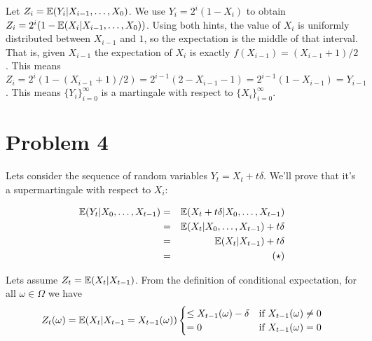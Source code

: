 \documentclass[a4paper]{article}
\begin{document}


Let $ Z_i = \mathbb{E}(Y_i | X_{i-1}, \dots, X_0) $. We use $ Y_i = 2^i(1 - X_i) $ to
obtain $ Z_i = 2^i(1 - \mathbb{E}(X_i|X_{i-1}, \dots, X_0)) $. Using both hints, the
value of $ X_i $ is uniformly distributed between $ X_{i-1} $ and $ 1 $, so the
expectation is the middle of that interval. That is, given $ X_{i-1} $ the
expectation of $ X_i $ is exactly $ f(X_{i-1}) = (X_{i-1} + 1) / 2 $. This
means $ Z_i = 2^i(1 - (X_{i-1} + 1) / 2) = 2^{i-1}(2 - X_{i-1} - 1) = 2^{i-1}(1
- X_{i-1}) = Y_{i-1} $. This means $ \{ Y_i \}_{i=0}^{\infty} $ is
a martingale with respect to $ \{X_i\}_{i=0}^{\infty} $.

\section*{Problem 4}

Lets consider the sequence of random variables $ Y_t = X_t + t\delta $. We'll prove that it's a supermartingale with respect to $ X_i $:

\begin{eqnarray*}
\mathbb{E}(Y_t|X_0,\dots,X_{t-1})
  &=& \mathbb{E}(X_t + t\delta|X_0, \dots, X_{t-1}) \\
  &=& \mathbb{E}(X_t|X_0, \dots, X_{t-1}) + t\delta \\
  &=& \mathbb{E}(X_t|X_{t-1}) + t\delta \\
  &=& (\star) \\
\end{eqnarray*}

Lets assume $ Z_t = \mathbb{E}(X_t | X_{t-1}) $. From the definition of conditional expectation, for all $ \omega \in \Omega $ we have
\begin{eqnarray*}
Z_t(\omega) = \mathbb{E}(X_t | X_{t-1} = X_{t-1}(\omega)) \begin{cases}
  \le X_{t-1}(\omega) - \delta & \text{if $ X_{t-1}(\omega) \ne 0 $} \\
  = 0 & \text{if $ X_{t-1}(\omega) = 0 $} \\
\end{cases}
\end{eqnarray*}
\end{document}
